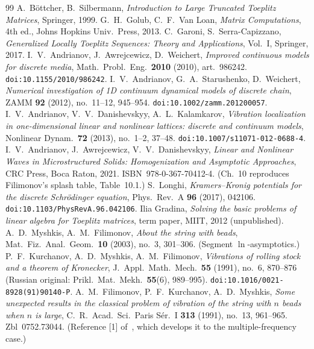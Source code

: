 \documentclass[11pt,reqno]{amsart}
\theoremstyle{plain}
\theoremstyle{definition}
\begin{document}
\begin{thebibliography}{99}
 A.~B\"ottcher, B.~Silbermann, \emph{Introduction to Large Truncated Toeplitz Matrices}, Springer, 1999.
 G.~H.~Golub, C.~F.~Van Loan, \emph{Matrix Computations}, 4th ed., Johns Hopkins Univ.\ Press, 2013.
 C.~Garoni, S.~Serra-Capizzano, \emph{Generalized Locally Toeplitz Sequences: Theory and Applications}, Vol.~I, Springer, 2017.
 I.~V.~Andrianov, J.~Awrejcewicz, D.~Weichert, \emph{Improved continuous models for discrete media}, Math.\ Probl.\ Eng.\ \textbf{2010} (2010), art.\ 986242. \texttt{doi:10.1155/2010/986242}.
 I.~V.~Andrianov, G.~A.~Starushenko, D.~Weichert, \emph{Numerical investigation of 1D continuum dynamical models of discrete chain}, ZAMM \textbf{92} (2012), no.~11--12, 945--954. \texttt{doi:10.1002/zamm.201200057}.
 I.~V.~Andrianov, V.~V.~Danishevskyy, A.~L.~Kalamkarov, \emph{Vibration localization in one-dimensional linear and nonlinear lattices: discrete and continuum models}, Nonlinear Dynam.\ \textbf{72} (2013), no.~1--2, 37--48. \texttt{doi:10.1007/s11071-012-0688-4}.
 I.~V.~Andrianov, J.~Awrejcewicz, V.~V.~Danishevskyy, \emph{Linear and Nonlinear Waves in Microstructured Solids: Homogenization and Asymptotic Approaches}, CRC Press, Boca Raton, 2021. ISBN~978-0-367-70412-4. (Ch.~10 reproduces Filimonov's splash table, Table~10.1.)
 S.~Longhi, \emph{Kramers--Kronig potentials for the discrete Schr\"odinger equation}, Phys.\ Rev.\ A \textbf{96} (2017), 042106. \texttt{doi:10.1103/PhysRevA.96.042106}.
 Ilia Gradina, \emph{Solving the basic problems of linear algebra for Toeplitz matrices}, term paper, MIIT, 2012 (unpublished).
 A.~D.~Myshkis, A.~M.~Filimonov, \emph{About the string with beads}, Mat.\ Fiz.\ Anal.\ Geom.\ \textbf{10} (2003), no.~3, 301--306. (Segment $\ln$-asymptotics.)
 P.~F.~Kurchanov, A.~D.~Myshkis, A.~M.~Filimonov, \emph{Vibrations of rolling stock and a theorem of Kronecker}, J.~Appl.\ Math.\ Mech.\ \textbf{55} (1991), no.~6, 870--876 (Russian original: Prikl.\ Mat.\ Mekh.\ \textbf{55}(6), 989--995). \texttt{doi:10.1016/0021-8928(91)90140-P}.
 A.~M.~Filimonov, P.~F.~Kurchanov, A.~D.~Myshkis, \emph{Some unexpected results in the classical problem of vibration of the string with $n$ beads when $n$ is large}, C.~R.~Acad.\ Sci.\ Paris S\'er.~I \textbf{313} (1991), no.~13, 961--965. Zbl~0752.73044. (Reference [1] of~\cite{F92}, which develops it to the multiple-frequency case.)

\end{thebibliography}
\end{document}
